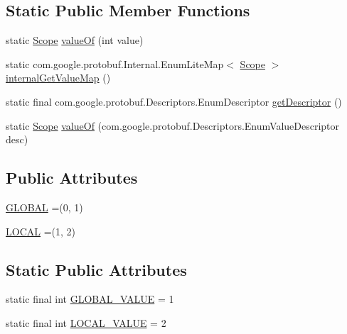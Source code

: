 \subsection*{Static Public Member Functions}
\begin{DoxyCompactItemize}
\item 
static \mbox{\hyperlink{enumcom_1_1mysql_1_1cj_1_1x_1_1protobuf_1_1_mysqlx_notice_1_1_frame_1_1_scope}{Scope}} \mbox{\hyperlink{enumcom_1_1mysql_1_1cj_1_1x_1_1protobuf_1_1_mysqlx_notice_1_1_frame_1_1_scope_aeccefa4a382c2ae4d6ea8b0e15beaaea}{value\+Of}} (int value)
\item 
static com.\+google.\+protobuf.\+Internal.\+Enum\+Lite\+Map$<$ \mbox{\hyperlink{enumcom_1_1mysql_1_1cj_1_1x_1_1protobuf_1_1_mysqlx_notice_1_1_frame_1_1_scope}{Scope}} $>$ \mbox{\hyperlink{enumcom_1_1mysql_1_1cj_1_1x_1_1protobuf_1_1_mysqlx_notice_1_1_frame_1_1_scope_ada1798bc8940a8c9b1a83b7f4f373a11}{internal\+Get\+Value\+Map}} ()
\item 
static final com.\+google.\+protobuf.\+Descriptors.\+Enum\+Descriptor \mbox{\hyperlink{enumcom_1_1mysql_1_1cj_1_1x_1_1protobuf_1_1_mysqlx_notice_1_1_frame_1_1_scope_a41ad03d26a8f9c439aecbe8dda751c3d}{get\+Descriptor}} ()
\item 
static \mbox{\hyperlink{enumcom_1_1mysql_1_1cj_1_1x_1_1protobuf_1_1_mysqlx_notice_1_1_frame_1_1_scope}{Scope}} \mbox{\hyperlink{enumcom_1_1mysql_1_1cj_1_1x_1_1protobuf_1_1_mysqlx_notice_1_1_frame_1_1_scope_a8db459b916ee949e9af44e263a61d16a}{value\+Of}} (com.\+google.\+protobuf.\+Descriptors.\+Enum\+Value\+Descriptor desc)
\end{DoxyCompactItemize}
\subsection*{Public Attributes}
\begin{DoxyCompactItemize}
\item 
\mbox{\hyperlink{enumcom_1_1mysql_1_1cj_1_1x_1_1protobuf_1_1_mysqlx_notice_1_1_frame_1_1_scope_ad6c30a7b16efef3554fe855c44ed06e9}{G\+L\+O\+B\+AL}} =(0, 1)
\item 
\mbox{\hyperlink{enumcom_1_1mysql_1_1cj_1_1x_1_1protobuf_1_1_mysqlx_notice_1_1_frame_1_1_scope_a9e6e59138253e35776c0436403bcd5cd}{L\+O\+C\+AL}} =(1, 2)
\end{DoxyCompactItemize}
\subsection*{Static Public Attributes}
\begin{DoxyCompactItemize}
\item 
static final int \mbox{\hyperlink{enumcom_1_1mysql_1_1cj_1_1x_1_1protobuf_1_1_mysqlx_notice_1_1_frame_1_1_scope_a70dd4634e978a3b3934bfae593922719}{G\+L\+O\+B\+A\+L\+\_\+\+V\+A\+L\+UE}} = 1
\item 
static final int \mbox{\hyperlink{enumcom_1_1mysql_1_1cj_1_1x_1_1protobuf_1_1_mysqlx_notice_1_1_frame_1_1_scope_af94f73f7b1013b79555b987716d3ad68}{L\+O\+C\+A\+L\+\_\+\+V\+A\+L\+UE}} = 2
\end{DoxyCompactItemize}


